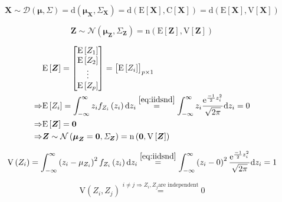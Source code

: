 \documentclass[
]{book}
\theoremstyle{definition}
\theoremstyle{definition}
\theoremstyle{definition}
\theoremstyle{definition}
\theoremstyle{remark}
\begin{document}
\[
\boldsymbol{X}\sim\mathcal{D}\left(\boldsymbol{\mu},\mathit{\Sigma}\right)=\mathrm{d}\left(\boldsymbol{\mu}_{\boldsymbol{X}},\mathit{\Sigma}_{\boldsymbol{X}}\right)=\mathrm{d}\left(\mathrm{E}\left[\boldsymbol{X}\right],\mathrm{C}\left[\boldsymbol{X}\right]\right)=\mathrm{d}\left(\mathrm{E}\left[\boldsymbol{X}\right],\mathrm{V}\left[\boldsymbol{X}\right]\right)
\]

\[
\boldsymbol{Z}\sim\mathcal{N}\left(\boldsymbol{\mu}_{\boldsymbol{Z}},\mathit{\Sigma}_{\boldsymbol{Z}}\right)=\mathrm{n}\left(\mathrm{E}\left[\boldsymbol{Z}\right],\mathrm{V}\left[\boldsymbol{Z}\right]\right)
\]

\[
\begin{aligned}
 & \mathrm{E}\left[\boldsymbol{Z}\right]=\begin{bmatrix}\mathrm{E}\left[Z_{1}\right]\\
\mathrm{E}\left[Z_{2}\right]\\
\vdots\\
\mathrm{E}\left[Z_{p}\right]
\end{bmatrix}=\begin{bmatrix}\mathrm{E}\left[Z_{i}\right]\end{bmatrix}_{p\times1}\\
\Rightarrow & \mathrm{E}\left[Z_{i}\right]=\int_{-\infty}^{\infty}z_{i}f_{Z_{i}}\left(z_{i}\right)\mathrm{d}z_{i}\overset{\eqref{eq:iidsnd}}{=}\int_{-\infty}^{\infty}z_{i}\frac{\mathrm{e}^{\frac{-1}{2}z_{i}^{2}}}{\sqrt{2\pi}}\mathrm{d}z_{i}=0\\
\Rightarrow & \mathrm{E}\left[\boldsymbol{Z}\right]=\boldsymbol{0}\\
\Rightarrow & \boldsymbol{Z}\sim\mathcal{N}\left(\boldsymbol{\mu}_{\boldsymbol{Z}}=\boldsymbol{0},\mathit{\Sigma}_{\boldsymbol{Z}}\right)=\mathrm{n}\left(\boldsymbol{0},\mathrm{V}\left[\boldsymbol{Z}\right]\right)
\end{aligned}
\]

\[
\mathrm{V}\left(Z_{i}\right)=\int_{-\infty}^{\infty}\left(z_{i}-\mu_{Z_{i}}\right)^{2}f_{Z_{i}}\left(z_{i}\right)\mathrm{d}z_{i}\overset{\eqref{eq:iidsnd}}{=}\int_{-\infty}^{\infty}\left(z_{i}-0\right)^{2}\frac{\mathrm{e}^{\frac{-1}{2}z_{i}^{2}}}{\sqrt{2\pi}}\mathrm{d}z_{i}=1
\]

\begin{equation}
\label{eq:idpsmnd}
\mathrm{V}\left(Z_{i},Z_{j}\right)\overset{i\ne j\Rightarrow Z_{i},Z_{j}\text{are independent}}{=}0
\end{equation}
\end{document}

